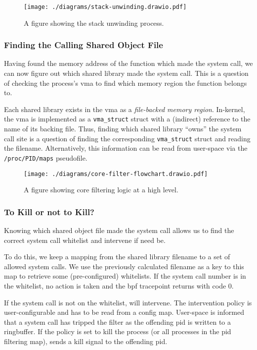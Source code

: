 \begin{figure}[ht]
    \centering
    \texttt{[image: ./diagrams/stack-unwinding.drawio.pdf]} 
    \caption{A figure showing the stack unwinding process.}
    \label{fig:stack-unwinding}
\end{figure}

\subsubsection{Finding the Calling Shared Object File}\label{subsubsec:find_so}

Having found the memory address of the function which made the system call, we
can now figure out which shared library made the system call. This is a
question of checking the process's \ac{vma} to find which memory region the
function belongs to. 

Each shared library exists in the \ac{vma} as a \textit{file-backed memory region}.
In-kernel, the \ac{vma} is implemented as a \texttt{vma\_struct} struct with a
(indirect) reference to the name of its backing file. Thus, finding which
shared library ``owns'' the system call site is a question of finding the
corresponding \texttt{vma\_struct} struct and reading the filename.
Alternatively, this information can be read from user-space via the
\texttt{/proc/PID/maps} pseudofile.

\begin{figure}[h]
    \centering
    \texttt{[image: ./diagrams/core-filter-flowchart.drawio.pdf]}
    \caption{A figure showing \afg core filtering logic at a high level.}
    \label{fig:core-filter-flowchart}
\end{figure}

\subsubsection{To Kill or not to Kill?}

Knowing which shared object file made the system call allows us to find the correct
system call whitelist and intervene if need be.

To do this, we keep a mapping from the shared library filename to a set of allowed
system calls. We use the previously calculated filename as a key to this map to
retrieve some (pre-configured) whitelists. If the system call number is in the
whitelist, no action is taken and the \ac{bpf} tracepoint returns with code 0.

If the system call is not on the whitelist, \af will intervene. The intervention
policy is user-configurable and has to be read from a config map. User-space is
informed that a system call has tripped the filter as the offending \ac{pid} is
written to a ringbuffer. If the policy is set to kill the process (or all 
processes in the \ac{pid} filtering map), \af sends a kill signal to the 
offending \ac{pid}. 

